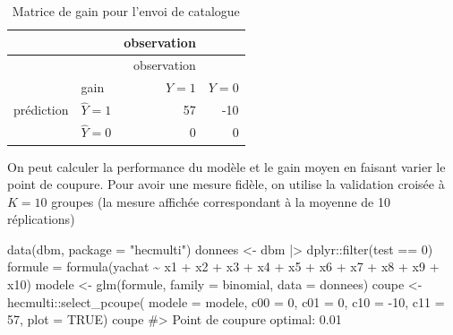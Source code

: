 \documentclass[
  11pt,
  letterpaper,
]{scrbook}
\newenvironment{Shaded}{\begin{snugshade}}{\end{snugshade}}
\newcommand{\AttributeTok}[1]{\textcolor[rgb]{0.40,0.45,0.13}{#1}}
\newcommand{\CommentTok}[1]{\textcolor[rgb]{0.37,0.37,0.37}{#1}}
\newcommand{\ConstantTok}[1]{\textcolor[rgb]{0.56,0.35,0.01}{#1}}
\newcommand{\DecValTok}[1]{\textcolor[rgb]{0.68,0.00,0.00}{#1}}
\newcommand{\FunctionTok}[1]{\textcolor[rgb]{0.28,0.35,0.67}{#1}}
\newcommand{\NormalTok}[1]{\textcolor[rgb]{0.00,0.23,0.31}{#1}}
\newcommand{\OtherTok}[1]{\textcolor[rgb]{0.00,0.23,0.31}{#1}}
\newcommand{\SpecialCharTok}[1]{\textcolor[rgb]{0.37,0.37,0.37}{#1}}
\newcommand{\StringTok}[1]{\textcolor[rgb]{0.13,0.47,0.30}{#1}}
\theoremstyle{definition}
\theoremstyle{remark}
\begin{document}
\hypertarget{tbl-03-gain3}{}
\begin{longtable}[]{@{}llrr@{}}
\caption{\label{tbl-03-gain3}Matrice de gain pour l'envoi de
catalogue}\tabularnewline
\toprule()
& & observation & \\
\midrule()
\endfirsthead
\toprule()
& & observation & \\
\midrule()
\endhead
& gain & \(Y=1\) & \(Y=0\) \\
prédiction & \(\widehat{Y}=1\) & 57 & -10 \\
& \(\widehat{Y}=0\) & 0 & 0 \\
\bottomrule()
\end{longtable}

On peut calculer la performance du modèle et le gain moyen en faisant
varier le point de coupure. Pour avoir une mesure fidèle, on utilise la
validation croisée à \(K=10\) groupes (la mesure affichée correspondant
à la moyenne de 10 réplications)

\begin{Shaded}
\begin{Highlighting}[]
\FunctionTok{data}\NormalTok{(dbm, }\AttributeTok{package =} \StringTok{"hecmulti"}\NormalTok{)}
\NormalTok{donnees }\OtherTok{\textless{}{-}}\NormalTok{ dbm }\SpecialCharTok{|\textgreater{}} 
\NormalTok{  dplyr}\SpecialCharTok{::}\FunctionTok{filter}\NormalTok{(test }\SpecialCharTok{==} \DecValTok{0}\NormalTok{)}
\NormalTok{formule }\OtherTok{=} \FunctionTok{formula}\NormalTok{(yachat }\SpecialCharTok{\textasciitilde{}}\NormalTok{ x1 }\SpecialCharTok{+}\NormalTok{ x2 }\SpecialCharTok{+}\NormalTok{ x3 }\SpecialCharTok{+}
\NormalTok{                    x4 }\SpecialCharTok{+}\NormalTok{ x5 }\SpecialCharTok{+}\NormalTok{ x6 }\SpecialCharTok{+}\NormalTok{ x7 }\SpecialCharTok{+} 
\NormalTok{                    x8 }\SpecialCharTok{+}\NormalTok{ x9 }\SpecialCharTok{+}\NormalTok{ x10)}
\NormalTok{modele }\OtherTok{\textless{}{-}} \FunctionTok{glm}\NormalTok{(formule, }
              \AttributeTok{family =}\NormalTok{ binomial, }
              \AttributeTok{data =}\NormalTok{ donnees)}
\NormalTok{coupe }\OtherTok{\textless{}{-}}\NormalTok{ hecmulti}\SpecialCharTok{::}\FunctionTok{select\_pcoupe}\NormalTok{(}
  \AttributeTok{modele =}\NormalTok{ modele, }
  \AttributeTok{c00 =} \DecValTok{0}\NormalTok{, }
  \AttributeTok{c01 =} \DecValTok{0}\NormalTok{, }
  \AttributeTok{c10 =} \SpecialCharTok{{-}}\DecValTok{10}\NormalTok{, }
  \AttributeTok{c11 =} \DecValTok{57}\NormalTok{,}
  \AttributeTok{plot =} \ConstantTok{TRUE}\NormalTok{)}
\NormalTok{coupe}
\CommentTok{\#\textgreater{} Point de coupure optimal: 0.01}
\end{Highlighting}
\end{Shaded}
\end{document}

